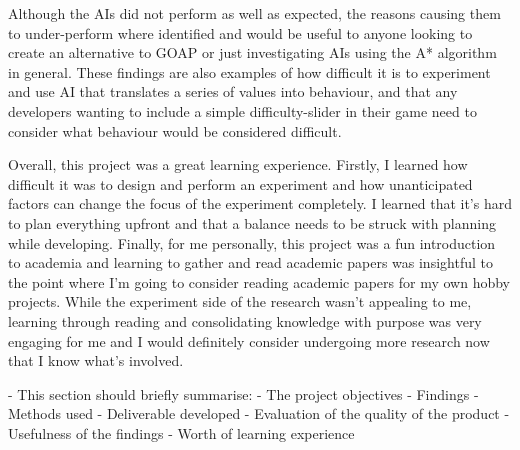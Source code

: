 \documentclass[11pt, a4paper]{report}
\begin{document}
Although the AIs did not perform as well as expected, the reasons causing them to under-perform where identified and would be useful to anyone looking to create an alternative to GOAP or just investigating AIs using the A* algorithm in general. These findings are also examples of how difficult it is to experiment and use AI that translates a series of values into behaviour, and that any developers wanting to include a simple difficulty-slider in their game need to consider what behaviour would be considered difficult. 

Overall, this project was a great learning experience. Firstly, I learned how difficult it was to design and perform an experiment and how unanticipated factors can change the focus of the experiment completely. I learned that it's hard to plan everything upfront and that a balance needs to be struck with planning while developing. Finally, for me personally, this project was a fun introduction to academia and learning to gather and read academic papers was insightful to the point where I'm going to consider reading academic papers for my own hobby projects. While the experiment side of the research wasn't appealing to me, learning through reading and consolidating knowledge with purpose was very engaging for me and I would definitely consider undergoing more research now that I know what's involved.

- This section should briefly summarise:
  - The project objectives
  - Findings
  - Methods used 
  - Deliverable developed
  - Evaluation of the quality of the product
  - Usefulness of the findings
  - Worth of learning experience

\cleardoublepage
\printbibliography[
  heading=bibintoc,
  title={Bibliography}
]
\end{document}
